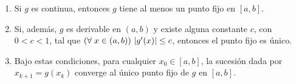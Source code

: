 \begin{enumerate}[label=(\roman*)]
\item Si $g$ es continua, entonces $g$ tiene al menos un punto fijo en $[a,b]$.

\item Si, además, $g$ es derivable en $(a,b)$ y existe alguna constante $c$,
    con $0 < c < 1$, tal que
    $\left(\forall\;x \in (a,b)\right)\, \lvert g'(x) \rvert \leq c$,
    entonces el punto fijo es único.

\item Bajo estas condiciones, para cualquier $x_0 \in [a,b]$, la sucesión dada
    por $x_{k+1} = g(x_k)$ converge al único punto fijo de $g$ en $[a,b]$.

    \label{punto-fijo:cond-convergencia}
\end{enumerate}

